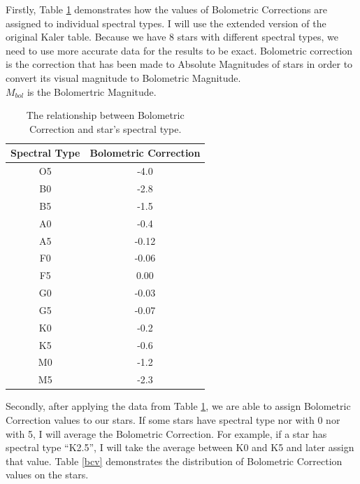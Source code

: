 \documentclass{article}
\begin{document}
Firstly, Table \ref{bc} demonstrates how the values of Bolometric Corrections are assigned to individual spectral types. I will use the extended version of the original Kaler table\cite{kaler}. Because we have 8 stars with different spectral types, we need to use more accurate data for the results to be exact. Bolometric correction is the correction that has been made to Absolute Magnitudes of stars in order to convert its visual magnitude to Bolometric Magnitude.\cite{bc}\\ $M_{bol}$ is the Bolomertric Magnitude.
  
  \begin{table}[h!]
    \begin{center}
      \centering
      \caption{The relationship between Bolometric Correction and star's spectral type.}
      \begin{tabular}{c | c}
        \textbf{Spectral Type} & \textbf{Bolometric Correction} \\
        \hline
        O5 & -4.0 \\
        B0 & -2.8 \\
        B5 & -1.5 \\
        A0 & -0.4 \\
        A5 & -0.12\\
        F0 & -0.06\\
        F5 & 0.00 \\
        G0 & -0.03\\
        G5 & -0.07\\
        K0 & -0.2 \\
        K5 & -0.6 \\
        M0 & -1.2 \\
        M5 & -2.3 \\
      \end{tabular}
      \label{bc}
    \end{center}
  \end{table}

  Secondly, after applying the data from Table \ref{bc}, we are able to assign Bolometric Correction values to our stars. If some stars have spectral type nor with 0 nor with 5, I will average the Bolometric Correction. For example, if a star has spectral type ``K2.5'', I will take the average between K0 and K5 and later assign that value. Table \ref{bcv} demonstrates the distribution of Bolometric Correction values on the stars.\\
\end{document}
